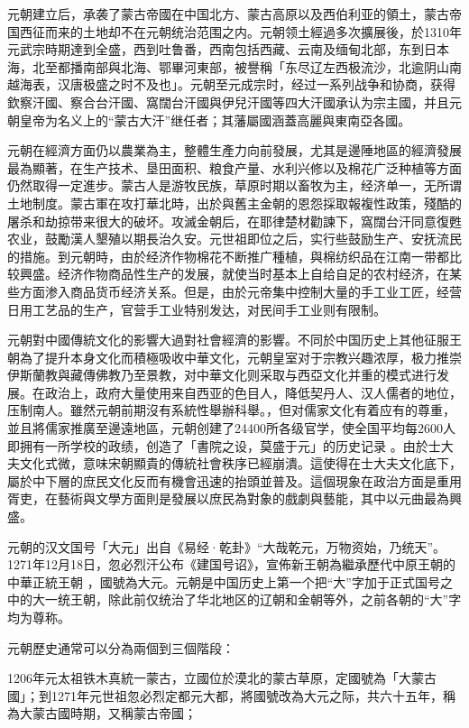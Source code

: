 元朝建立后，承袭了蒙古帝國在中国北方、蒙古高原以及西伯利亚的領土，蒙古帝国西征而来的土地却不在元朝统治范围之内。元朝领土經過多次擴展後，於1310年元武宗時期達到全盛，西到吐鲁番，西南包括西藏、云南及缅甸北部，东到日本海，北至都播南部與北海、鄂畢河東部，被譽稱「东尽辽左西极流沙，北逾阴山南越海表，汉唐极盛之时不及也」。元朝至元成宗时，经过一系列战争和协商，获得欽察汗國、察合台汗國、窩闊台汗國與伊兒汗國等四大汗國承认为宗主國，并且元朝皇帝为名义上的“蒙古大汗”继任者；其藩屬國涵蓋高麗與東南亞各國。

元朝在經濟方面仍以農業為主，整體生產力向前發展，尤其是邊陲地區的經濟發展最為顯著，在生产技术、垦田面积、粮食产量、水利兴修以及棉花广泛种植等方面仍然取得一定進步。蒙古人是游牧民族，草原时期以畜牧为主，经济单一，无所谓土地制度。蒙古軍在攻打華北時，出於與舊主金朝的恩怨採取報複性政策，殘酷的屠杀和劫掠带来很大的破坏。攻滅金朝后，在耶律楚材勸諫下，窩闊台汗同意復甦农业，鼓勵漢人墾殖以期長治久安。元世祖即位之后，实行些鼓励生产、安抚流民的措施。到元朝時，由於经济作物棉花不断推广種植，與棉纺织品在江南一带都比较興盛。经济作物商品性生产的发展，就使当时基本上自给自足的农村经济，在某些方面渗入商品货币经济关系。但是，由於元帝集中控制大量的手工业工匠，经营日用工艺品的生产，官营手工业特别发达，对民间手工业则有限制。

元朝對中國傳統文化的影響大過對社會經濟的影響。不同於中国历史上其他征服王朝為了提升本身文化而積極吸收中華文化，元朝皇室对于宗教兴趣浓厚，极力推崇伊斯蘭教與藏傳佛教乃至景教，对中華文化则采取与西亞文化并重的模式进行发展。在政治上，政府大量使用来自西亚的色目人，降低契丹人、汉人儒者的地位，压制南人。雖然元朝前期沒有系統性舉辦科舉。，但对儒家文化有着应有的尊重，並且將儒家推廣至邊遠地區，元朝创建了24400所各级官学，使全国平均每2600人即拥有一所学校的政绩，创造了「書院之设，莫盛于元」的历史记录 。由於士大夫文化式微，意味宋朝顯貴的傳統社會秩序已經崩潰。這使得在士大夫文化底下，屬於中下層的庶民文化反而有機會迅速的抬頭並普及。這個現象在政治方面是重用胥吏，在藝術與文學方面則是發展以庶民為對象的戲劇與藝能，其中以元曲最為興盛。

元朝的汉文国号「大元」出自《易经·乾卦》“大哉乾元，万物资始，乃统天”。1271年12月18日，忽必烈汗公布《建国号诏》，宣佈新王朝為繼承歷代中原王朝的中華正統王朝 ，國號為大元。元朝是中国历史上第一个把“大”字加于正式国号之中的大一统王朝，除此前仅统治了华北地区的辽朝和金朝等外，之前各朝的“大”字均为尊称。

元朝歷史通常可以分為兩個到三個階段：

1206年元太祖铁木真統一蒙古，立國位於漠北的蒙古草原，定國號為「大蒙古國」；到1271年元世祖忽必烈定都元大都，將國號改為大元之际，共六十五年，稱為大蒙古國時期，又稱蒙古帝國；

